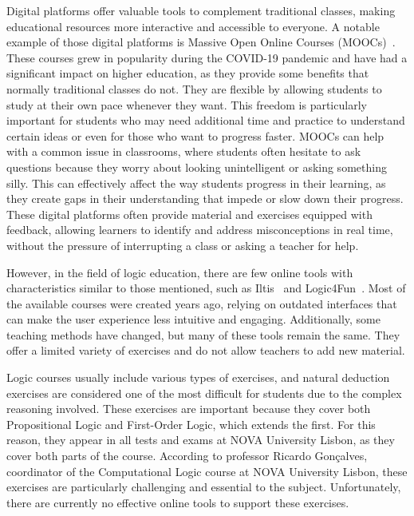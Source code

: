 Digital platforms offer valuable tools to complement traditional classes, making educational resources more interactive and accessible to everyone. A notable example of those digital platforms is Massive Open Online Courses (MOOCs)~\cite{alhazzani_2020_moocs}. These courses grew in popularity during the COVID-19 pandemic and have had a significant impact on higher education, as they provide some benefits that normally traditional classes do not. They are flexible by allowing students to study at their own pace whenever they want. This freedom is particularly important for students who may need additional time and practice to understand certain ideas or even for those who want to progress faster. MOOCs can help with a common issue in classrooms, where students often hesitate to ask questions because they worry about looking unintelligent or asking something silly. This can effectively affect the way students progress in their learning, as they create gaps in their understanding that impede or slow down their progress. These digital platforms often provide material and exercises equipped with feedback, allowing learners to identify and address misconceptions in real time, without the pressure of interrupting a class or asking a teacher for help.

However, in the field of logic education, there are few online tools with characteristics similar to those mentioned, such as Iltis~\cite{geck_iltis, geck_2018_introduction} and Logic4Fun~\cite{slaney_logic}. Most of the available courses were created years ago, relying on outdated interfaces that can make the user experience less intuitive and engaging. Additionally, some teaching methods have changed, but many of these tools remain the same. They offer a limited variety of exercises and do not allow teachers to add new material.

Logic courses usually include various types of exercises, and natural deduction exercises are considered one of the most difficult for students due to the complex reasoning involved. These exercises are important because they cover both Propositional Logic and First-Order Logic, which extends the first. For this reason, they appear in all tests and exams at NOVA University Lisbon, as they cover both parts of the course. According to professor Ricardo Gonçalves, coordinator of the Computational Logic course at NOVA University Lisbon, these exercises are particularly challenging and essential to the subject. Unfortunately, there are currently no effective online tools to support these exercises.


